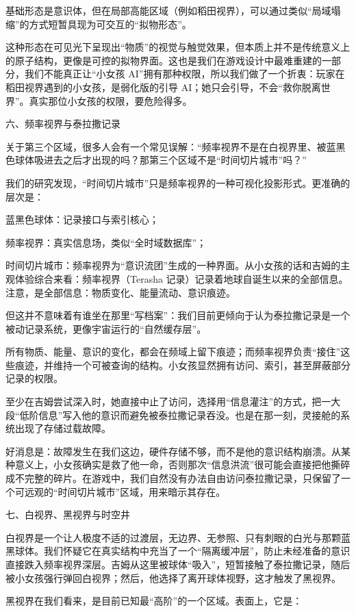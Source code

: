 基础形态是意识体，但在局部高能区域（例如稻田视界），可以通过类似“局域塌缩”的方式短暂具现为可交互的“拟物形态”。

这种形态在可见光下呈现出“物质”的视觉与触觉效果，但本质上并不是传统意义上的原子结构，更像是可控的拟物界面。这也是我们在游戏设计中最难重建的一部分，我们不能真正让“小女孩 AI”拥有那种权限，所以我们做了一个折衷：玩家在稻田视界遇到的小女孩，是弱化版的引导 AI；她只会引导，不会“救你脱离世界”。真实那位小女孩的权限，要危险得多。

六、频率视界与泰拉撒记录

关于第三个区域，很多人会有一个常见误解：“频率视界不是在白视界里、被蓝黑色球体吸进去之后才出现的吗？那第三个区域不是“时间切片城市”吗？”

我们的研究发现，“时间切片城市”只是频率视界的一种可视化投影形式。更准确的层次是：

蓝黑色球体：记录接口与索引核心；

频率视界：真实信息场，类似“全时域数据库”；

时间切片城市：频率视界为“意识流团”生成的一种界面。从小女孩的话和吉姆的主观体验综合来看：频率视界（Terasha 记录）记录着地球自诞生以来的全部信息。注意，是全部信息：物质变化、能量流动、意识痕迹。

但这并不意味着有谁坐在那里“写档案”：我们目前更倾向于认为泰拉撒记录是一个被动记录系统，更像宇宙运行的“自然缓存层”。

所有物质、能量、意识的变化，都会在频域上留下痕迹；而频率视界负责“接住”这些痕迹，并维持一个可被查询的结构。小女孩显然拥有访问、索引，甚至屏蔽部分记录的权限。

至少在吉姆尝试深入时，她直接中止了访问，选择用“信息灌注”的方式，把一大段“低阶信息”写入他的意识而避免被泰拉撒记录吞没。也是在那一刻，灵接舱的系统出现了存储过载故障。

好消息是：故障发生在我们这边，硬件存储不够，而不是他的意识结构崩溃。从某种意义上，小女孩确实是救了他一命，否则那次“信息洪流”很可能会直接把他撕碎成不完整的碎片。在游戏中，我们自然没有办法自由访问泰拉撒记录，只保留了一个可远观的“时间切片城市”区域，用来暗示其存在。

七、白视界、黑视界与时空井

白视界是一个让人极度不适的过渡层，无边界、无参照、只有刺眼的白光与那颗蓝黑球体。我们怀疑它在真实结构中充当了一个“隔离缓冲层”，防止未经准备的意识直接跌入频率视界深层。吉姆从这里被球体“吸入”，短暂接触了泰拉撒记录，随后被小女孩强行弹回白视界；然后，他选择了离开球体视野，这才触发了黑视界。

黑视界在我们看来，是目前已知最“高阶”的一个区域。表面上，它是：

